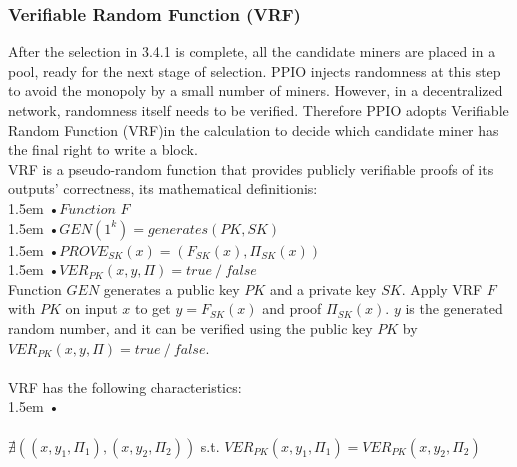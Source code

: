 \documentclass[10pt,a4paper]{article}
\begin{document}
                   
        \subsubsection{Verifiable Random Function (VRF)}  %
 \noindent 
After the selection in 3.4.1 is complete, all the candidate miners are placed in a pool, ready for the next stage of selection. PPIO injects randomness at this step to avoid the monopoly by a small number of miners. However, in a decentralized network, randomness itself needs to be verified. Therefore PPIO adopts Verifiable Random Function (VRF)\cite{article20}in the calculation to decide which candidate miner has the final right to write a block.
\vspace{-0.5em}
\\

\noindent  
VRF is a pseudo-random function that provides publicly verifiable proofs of its outputs' correctness\cite{article24}, 
 its mathematical definition\cite{article25}is:
 \vspace{-0.8em}
\\

\hangindent 1.5em
\noindent   
•\quad $Function$ $F$
\\
\hangindent 1.5em
\noindent   
•\quad $GEN\left(1^k\right)=generates\left(PK, SK\right)$
\\
\hangindent 1.5em
\noindent   
•\quad$PROVE_{SK}(x)=(F_{SK}(x), \Pi_{SK}(x))$
\\
\hangindent 1.5em
\noindent   
•\quad $VER_{PK}(x, y, \Pi)= true \mathbin{/} false$
\vspace{-0.5em}
\\

\noindent   
Function $GEN$ generates a public key $PK$ and a private key $SK$. Apply VRF $F$ with $PK$ on input $x$ to get $y=F_{SK}(x)$ and proof $\Pi_{SK}(x)$. $y$ is the generated random number, and it can be verified using the public key $PK$ by $VER_{PK}(x, y, \Pi)= true \mathbin{/} false$.
\vspace{-0.5em}
\\ \\VRF has the following characteristics:
\vspace{-0.8em}
\\

\hangindent 1.5em
\noindent   
•
\vspace{-0.8em}
\\ \\$\nexists((x, y_{1}, \Pi_{1}), (x, y_{2}, \Pi_{2}))$ s.t. $VER_{PK}(x, y_{1}, \Pi_{1})=VER_{PK}(x, y_{2}, \Pi_{2})$
\vspace{-0.8em}
\\
\end{document}

